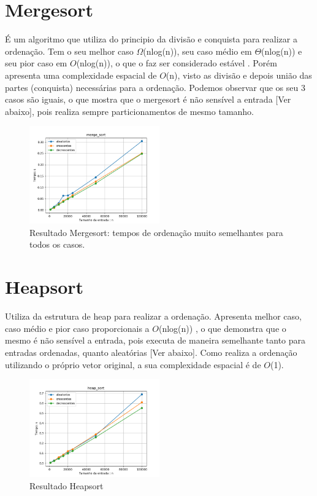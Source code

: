 \documentclass[10pt,a4paper]{article}
\begin{document}
\section{Mergesort}
    \indent É um algoritmo que utiliza do principio da divisão e conquista para realizar a ordenação. Tem o seu melhor caso $\Omega$(nlog(n)), seu caso médio em $\Theta$(nlog(n)) e seu pior caso em $O$(nlog(n)), o que o faz ser considerado estável \cite{qin}. Porém apresenta uma complexidade espacial de $O$(n), visto as divisão e depois união das partes (conquista) necessárias para a ordenação. Podemos observar que os seu 3 casos são iguais, o que mostra que o mergesort é não sensível a entrada [Ver abaixo], pois realiza sempre particionamentos de mesmo tamanho.  
    \begin{figure}[H]
    	\centering
    	\includegraphics[width=0.5\textwidth]{Resultados/Graficos/merge_sort.png}
    	\caption{Resultado Mergesort: tempos de ordenação muito semelhantes para todos os casos.}
    \end{figure}

\section{Heapsort}
    \indent Utiliza da estrutura de heap para realizar a ordenação. Apresenta melhor caso, caso médio e pior caso proporcionais a $O$(nlog(n)) \cite{schaffer}, o que demonstra que o mesmo é não sensível a entrada, pois executa de maneira semelhante tanto para entradas ordenadas, quanto aleatórias [Ver abaixo]. Como realiza a ordenação utilizando o próprio vetor original, a sua complexidade espacial é de $O$(1).
    \begin{figure}[H]
    	\centering
    	\includegraphics[width=0.5\textwidth]{Resultados/Graficos/heap_sort.png}
    	\caption{Resultado Heapsort}
    \end{figure}
\end{document}
